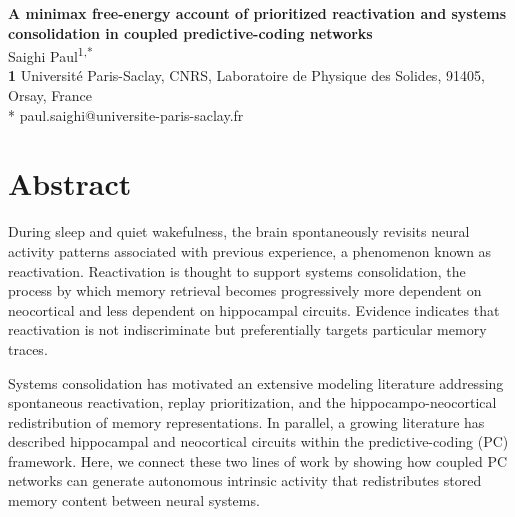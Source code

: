 \documentclass[10pt,letterpaper]{article}
\theoremstyle{plain}
\theoremstyle{remark}
\begin{document}
\begin{flushleft}
{\Large\textbf{A minimax free-energy account of prioritized reactivation and systems consolidation in coupled predictive-coding networks}}
\newline\\
Saighi Paul\textsuperscript{1,*}
\\
\bigskip
\textbf{1} Universit\'e Paris-Saclay, CNRS, Laboratoire de Physique des Solides, 91405, Orsay, France\\
\bigskip
* paul.saighi@universite-paris-saclay.fr
\end{flushleft}


\section*{Abstract}



During sleep and quiet wakefulness, the brain spontaneously revisits neural activity patterns associated with previous experience, a phenomenon known as reactivation. Reactivation is thought to support systems consolidation, the process by which memory retrieval becomes progressively more dependent on neocortical and less dependent on hippocampal circuits. 
Evidence indicates that reactivation is not indiscriminate but preferentially targets particular memory traces.

Systems consolidation has motivated an extensive modeling literature addressing spontaneous reactivation, replay prioritization, and the hippocampo-neocortical redistribution of memory representations. In parallel, a growing literature has described hippocampal and neocortical circuits within the predictive-coding (PC) framework. Here, we connect these two lines of work by showing how coupled PC networks can generate autonomous intrinsic activity that redistributes stored memory content between neural systems.
\end{document}
